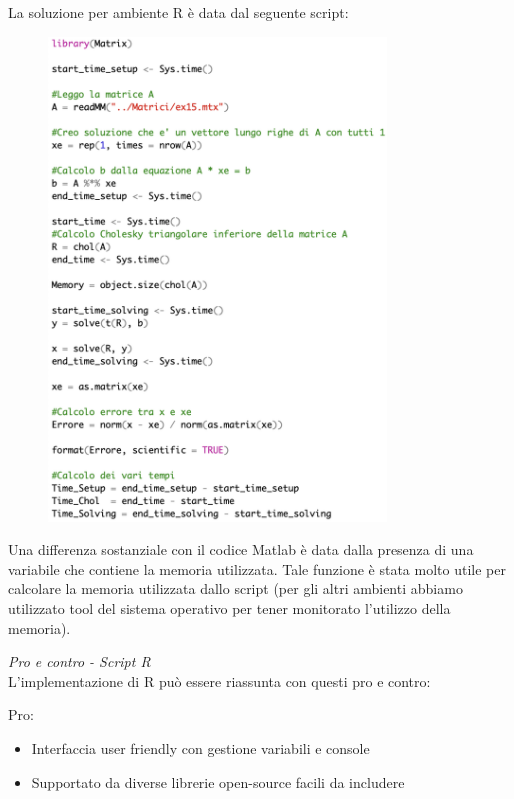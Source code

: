 \documentclass[preprint,12pt]{elsarticle}
\begin{document}
La soluzione per ambiente R è data dal seguente script:

\begin{figure}[H]
	\includegraphics[width=0.80\textwidth]{rcode}
\end{figure}

Una differenza sostanziale con il codice Matlab è data dalla presenza di una variabile che contiene la memoria utilizzata. Tale funzione è stata molto utile per calcolare la memoria utilizzata dallo script (per gli altri ambienti abbiamo utilizzato tool del sistema operativo per tener monitorato l'utilizzo della memoria).
\medskip


\textit{Pro e contro - Script R}\\
\vspace{4mm}
L'implementazione di R può essere riassunta con questi pro e contro:

Pro:
\begin{itemize}
	\item Interfaccia user friendly con gestione variabili e console
	\item Supportato da diverse librerie open-source facili da includere
\end{itemize}
\end{document}
